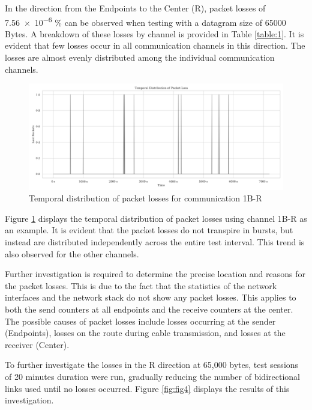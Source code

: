 \documentclass[	a4paper,
				11pt,
				DIV=11,
				bigheadings,
				idxtotoc,
				listof=totoc,	
				bibtotoc,		
				halfparskip,
				cleardoubleempty,
				oneside,
				openright]{scrartcl}
\begin{document}
In the direction from the Endpoints to the Center (R), packet losses of \num{7.56e-6} \% can be observed when testing with a datagram size of 65000 Bytes. A breakdown of these losses by channel is provided in Table \ref{table:1}. It is evident that few losses occur in all communication channels in this direction. The losses are almost evenly distributed among the individual communication channels.

\begin{figure}[h]
	\includegraphics[width=\textwidth]{fig3.png}
	\centering
	\caption{Temporal distribution of packet losses for communication 1B-R}
    \label{fig:fig3}
\end{figure}

Figure \ref{fig:fig3} displays the temporal distribution of packet losses using channel 1B-R as an example. It is evident that the packet losses do not transpire in bursts, but instead are distributed independently across the entire test interval. This trend is also observed for the other channels.

Further investigation is required to determine the precise location and reasons for the packet losses. This is due to the fact that the statistics of the network interfaces and the network stack do not show any packet losses. This applies to both the send counters at all endpoints and the receive counters at the center. The possible causes of packet losses include losses occurring at the sender (Endpoints), losses on the route during cable transmission, and losses at the receiver (Center).

To further investigate the losses in the R direction at 65,000 bytes, test sessions of 20 minutes duration were run, gradually reducing the number of bidirectional links used until no losses occurred. Figure \ref{fig:fig4} displays the results of this investigation.
\end{document}
